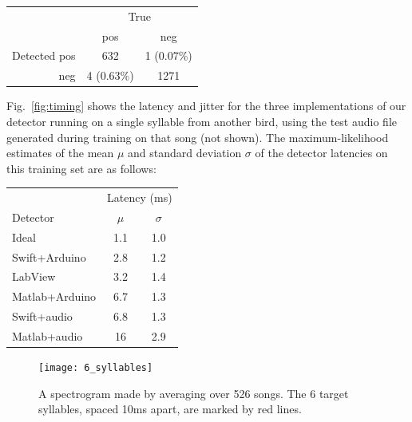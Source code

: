 \documentclass[10pt,letterpaper]{article}
\newcommand\fig[1]{Fig.~\ref{#1}}
\begin{document}
\vspace{4pt}

\begin{tabular}{r|cc}
  & \multicolumn{2}{c}{True} \\
  & pos & neg \\
  \hline
  Detected pos & 632 & 1 (0.07\%)\\
  neg & 4 (0.63\%) & 1271
\end{tabular}

\vspace{4pt}

\fig{fig:timing} shows the latency and jitter for the three implementations of our detector running on a
single syllable from another bird, using the test audio file generated
during training on that song (not shown).  The maximum-likelihood estimates of the mean $\mu$ and standard deviation $\sigma$ of the detector latencies on this training set are as follows:

\vspace{4pt}

\begin{tabular}{l|c|c}
  & \multicolumn{2}{c}{Latency (ms)}\\
  Detector & $\mu$ & $\sigma$ \\
  \hline
  Ideal & 1.1 & 1.0 \\
  Swift+Arduino & 2.8 & 1.2 \\
  LabView & 3.2 & 1.4 \\
  Matlab+Arduino & 6.7 & 1.3 \\
  Swift+audio & 6.8 & 1.3 \\
  Matlab+audio & 16 & 2.9
\end{tabular}

\vspace{4pt}


\begin{figure}
  \texttt{[image: 6\_syllables]}
  \caption{A spectrogram made by averaging over 526 songs. The 6
    target syllables, spaced 10ms apart, are marked by red lines.}
    \label{fig:sixsyllables}
\end{figure}
\end{document}
